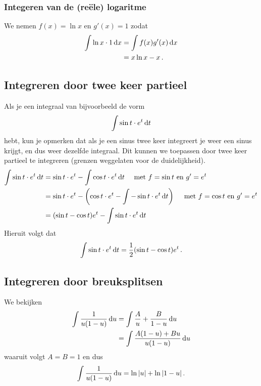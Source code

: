 \documentclass{article}
\begin{document}
             \subsubsection{Integeren van de (re\"ele) logaritme}
				We nemen $f(x)=\ln x$ en $g'(x)=1$ zodat
				\begin{align*}
					\int \ln x \cdot 1 \mathop{}\!\mathrm{d} x &= \int f(x)g'(x) \mathop{}\!\mathrm{d} x \\
					&= x \ln x - x \,.
				\end{align*}

        \subsection{Integreren door twee keer partieel}
            Als je een integraal van bijvoorbeeld de vorm
            \[
                \int \sin t \cdot e^t \mathop{}\!\mathrm{d} t
            \]
            hebt, kun je opmerken dat als je een sinus twee keer integreert je weer een sinus
            krijgt, en dus weer dezelfde integraal. Dit kunnen we toepassen
            door twee keer partieel te integreren (grenzen weggelaten voor de duidelijkheid).
            \begin{align*}
                \int \sin t \cdot e^t \mathop{}\!\mathrm{d} t &= \sin t \cdot e^t - \int \cos t \cdot e^t \mathop{}\!\mathrm{d} t
                \quad \text{ met $f=\sin t$ en $g'=e^t$} \\
                &= \sin t \cdot e^t - \left( \cos t \cdot e^t - \int - \sin t \cdot e^t \mathop{}\!\mathrm{d} t \right)
                \quad \text{ met $f=\cos t$ en $g'=e^t$} \\
                &= ( \sin t - \cos t ) e^t -  \int \sin t \cdot e^t \mathop{}\!\mathrm{d} t
            \end{align*}
            Hieruit volgt dat
            \[  \int \sin t \cdot e^t \mathop{}\!\mathrm{d} t = \frac{1}{2} ( \sin t - \cos t ) e^t\,. \]

        \subsection{Integreren door breuksplitsen}
            We bekijken
            \begin{align*}
                \int \frac{1}{u(1-u)} \mathop{}\!\mathrm{d} u &= \int \frac{A}{u} + \frac{B}{1-u} \mathop{}\!\mathrm{d} u \\
                &= \int \frac{A(1-u)+Bu}{u(1-u)} \mathop{}\!\mathrm{d} u
            \end{align*}
            waaruit volgt $A=B=1$ en dus
            \[ \int \frac{1}{u(1-u)} \mathop{}\!\mathrm{d} u = \ln |u| + \ln |1-u|\,. \]
\end{document}
